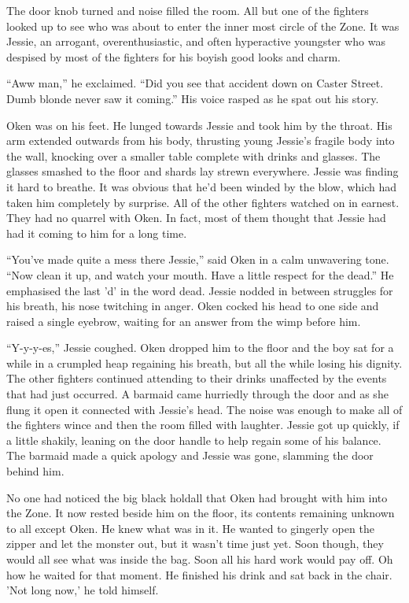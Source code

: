 The door knob turned and noise filled the room. All but one of the fighters looked up to see who was about to enter the inner most circle of the Zone. It was Jessie, an arrogant, overenthusiastic, and often hyperactive youngster who was despised by most of the fighters for his boyish good looks and charm.

``Aww man,'' he exclaimed. ``Did you see that accident down on Caster Street. Dumb blonde never saw it coming.'' His voice rasped as he spat out his story.

Oken was on his feet. He lunged towards Jessie and took him by the throat. His arm extended outwards from his body, thrusting young Jessie's fragile body into the wall, knocking over a smaller table complete with drinks and glasses. The glasses smashed to the floor and shards lay strewn everywhere. Jessie was finding it hard to breathe. It was obvious that he'd been winded by the blow, which had taken him completely by surprise. All of the other fighters watched on in earnest. They had no quarrel with Oken. In fact, most of them thought that Jessie had had it coming to him for a long time.

``You've made quite a mess there Jessie,'' said Oken in a calm unwavering tone. ``Now clean it up, and watch your mouth. Have a little respect for the dead.'' He emphasised the last 'd' in the word dead. Jessie nodded in between struggles for his breath, his nose twitching in anger. Oken cocked his head to one side and raised a single eyebrow, waiting for an answer from the wimp before him.

``Y-y-y-es,'' Jessie coughed. Oken dropped him to the floor and the boy sat for a while in a crumpled heap regaining his breath, but all the while losing his dignity. The other fighters continued attending to their drinks unaffected by the events that had just occurred. A barmaid came hurriedly through the door and as she flung it open it connected with Jessie's head. The noise was enough to make all of the fighters wince and then the room filled with laughter. Jessie got up quickly, if a little shakily, leaning on the door handle to help regain some of his balance. The barmaid made a quick apology and Jessie was gone, slamming the door behind him.

No one had noticed the big black holdall that Oken had brought with him into the Zone. It now rested beside him on the floor, its contents remaining unknown to all except Oken. He knew what was in it. He wanted to gingerly open the zipper and let the monster out, but it wasn't time just yet. Soon though, they would all see what was inside the bag. Soon all his hard work would pay off. Oh how he waited for that moment. He finished his drink and sat back in the chair. 'Not long now,' he told himself.
